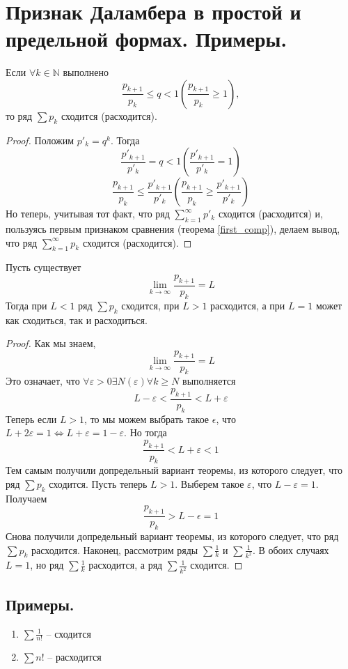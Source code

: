 \section{Признак Даламбера в простой и предельной формах. Примеры.}

\begin{theorem}
    Если $\forall k \in \mathbb{N}$ выполнено
    \[
        \frac{p_{k+1}}{p_{k}} \leqslant q < 1
        \left(
            \frac{p_{k+1}}{p_{k}} \geqslant 1
        \right)
        ,
    \] то ряд $\sum p_k$ сходится (расходится).
    \begin{proof}
        Положим $p'_k = q^k$. Тогда
        \[
            \frac{p'_{k+1}}{p'_k} = q < 1
            \left(
                \frac{p'_{k+1}}{p'_k} = 1
            \right)
        \]
        \[
            \frac{p_{k+1}}{p_{k}} \leqslant
            \frac{p'_{k+1}}{p'_{k}}
            \left(
                \frac{p_{k+1}}{p_{k}} \geqslant
                \frac{p'_{k+1}}{p'_{k}}
            \right)
        \]
        Но теперь, учитывая тот факт, что ряд $\sum_{k=1}^{\infty} p'_k$ сходится (расходится) и, пользуясь первым признаком сравнения (теорема \ref{first_comp}), делаем вывод, что ряд $\sum_{k=1}^{\infty} p_k$ сходится (расходится).
    \end{proof}
\end{theorem}

\begin{theorem}
    Пусть существует
    \[
        \lim_{k \to \infty} \frac{p_{k+1}}{p_{k}} = L
    \]
    Тогда при $L < 1$ ряд $\sum p_k$ сходится, при $L > 1$ расходится, а при $L = 1$ может как сходиться, так и расходиться.
    \begin{proof}
        Как мы знаем,
        \[
            \lim_{k \to \infty} \frac{p_{k+1}}{p_{k}} = L
        \]
        Это означает, что $\forall \varepsilon > 0 \exists N(\varepsilon) \forall k \geqslant N$ выполняется
        \[
            L - \varepsilon < \frac{p_{k+1}}{p_{k}} < L + \varepsilon
        \]
        Теперь если $L > 1$, то мы можем выбрать такое $\epsilon$, что $L + 2 \varepsilon = 1 \Leftrightarrow L + \varepsilon = 1 - \varepsilon$. Но тогда
        \[
            \frac{p_{k+1}}{p_k} < L + \varepsilon < 1
        \]
        Тем самым получили допредельный вариант теоремы, из которого следует, что ряд $\sum p_k$ сходится.
        \newline
        Пусть теперь $L > 1$. Выберем такое $\varepsilon$, что $L - \varepsilon = 1$. Получаем
        \[
            \frac{p_{k+1}}{p_k} > L - \epsilon = 1
        \]
        Снова получили допредельный вариант теоремы, из которого следует, что ряд $\sum p_k$ расходится.
        \newline
        Наконец, рассмотрим ряды $\sum \frac{1}{k}$ и $\sum \frac{1}{k^2}$. В обоих случаях $L=1$, но ряд $\sum \frac{1}{k}$ расходится, а ряд $\sum \frac{1}{k^2}$ сходится.
    \end{proof}
\end{theorem}

\subsection{Примеры.}
\begin{enumerate}
    \item $\sum \frac{1}{n!}$ -- сходится
    \item $\sum n!$ -- расходится
\end{enumerate}